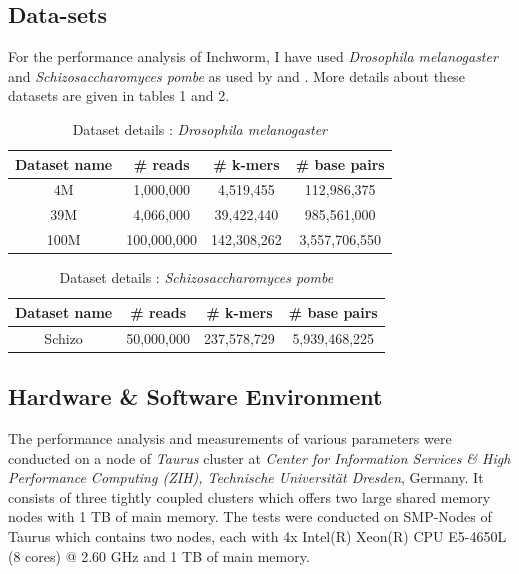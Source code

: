\label{key}\documentclass[plainarticle, english ,zihtitle,final,hyperref,utf8]{zihpub}
\begin{document}
\subsection{Data-sets}
For the performance analysis of Inchworm, I have used \emph{Drosophila melanogaster} and \emph{Schizosaccharomyces pombe} as used by \cite{zhao} and \cite{performance}. More details about these datasets are given in tables 1 and 2.\\
\begin{table}
\begin{center}
\begin{tabular}{| c | c | c | c |}        
\hline            
  Dataset name & \# reads & \# k-mers & \# base pairs \\	\hline
  4M & 1,000,000 & 4,519,455 & 112,986,375 \\  \hline
 39M & 4,066,000 & 39,422,440 & 985,561,000 \\ \hline
 100M & 100,000,000 & 142,308,262 & 3,557,706,550 \\
  \hline  
\end{tabular}
\end{center}
\caption{Dataset details : \emph{Drosophila melanogaster}}
\end{table}
\begin{table}
\begin{center}
\begin{tabular}{| c | c | c | c |}        
\hline            
  Dataset name & \# reads & \# k-mers & \# base pairs \\	\hline
  Schizo & 50,000,000 & 237,578,729 & 5,939,468,225 \\
  \hline  
\end{tabular}
\end{center}
\caption{Dataset details : \emph{Schizosaccharomyces pombe}}
\end{table}
\subsection{Hardware \& Software Environment}
The performance analysis and measurements of various parameters were conducted on a node of \emph{Taurus} cluster at \emph{Center for Information Services \& High Performance Computing (ZIH), Technische Universit{\"a}t Dresden}, Germany. It consists of three tightly coupled clusters which offers two large shared memory nodes with 1 TB of main memory. The tests were conducted on SMP-Nodes of Taurus which contains two nodes, each with 4x Intel(R) Xeon(R) CPU E5-4650L (8 cores) @ 2.60 GHz and 1 TB of main memory.
\end{document}
